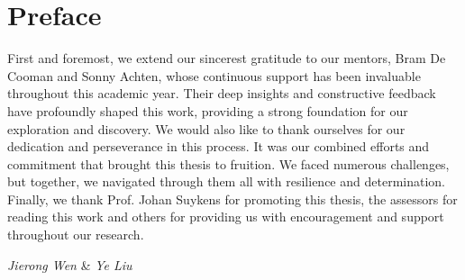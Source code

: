 \chapter*{Preface}

First and foremost, we extend our sincerest gratitude to our mentors, Bram De Cooman and Sonny Achten, whose continuous support has been invaluable throughout this academic year. Their deep insights and constructive feedback have profoundly shaped this work, providing a strong foundation for our exploration and discovery. We would also like to thank ourselves for our dedication and perseverance in this process. It was our combined efforts and commitment that brought this thesis to fruition. We faced numerous challenges, but together, we navigated through them all with resilience and determination. Finally, we thank Prof. Johan Suykens for promoting this thesis, the assessors for reading this work and others for providing us with encouragement and support throughout our research.

\hspace*{0pt}\hfill \emph{Jierong Wen }\&\emph{ Ye Liu}
